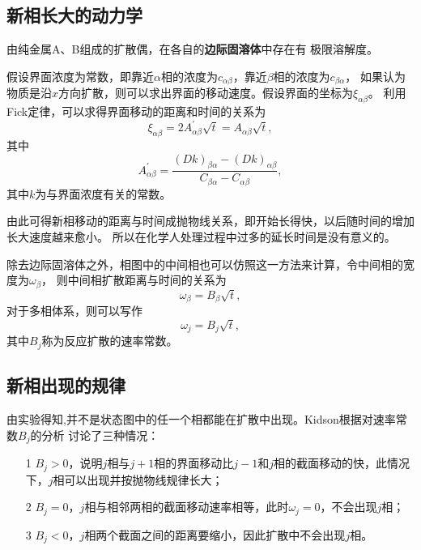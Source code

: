         \subsection{新相长大的动力学}
            由纯金属A、B组成的扩散偶，在各自的\textbf{边际固溶体}中存在有
            极限溶解度。

            假设界面浓度为常数，即靠近$\alpha$相的浓度为$c_{\alpha\beta}$，靠近$\beta$相的浓度为$c_{\beta\alpha}$，
            如果认为物质是沿$x$方向扩散，则可以求出界面的移动速度。假设界面的坐标为$\xi_{\alpha\beta}$。
            利用Fick定律，可以求得界面移动的距离和时间的关系为
            \begin{equation}
                \xi_{\alpha \beta}=2 A_{\alpha \beta}^{\prime} \sqrt{t}=A_{\alpha \beta} \sqrt{t},
            \end{equation}
            其中
            \begin{equation}
                A_{\alpha \beta}^{\prime}=\frac{(D k)_{\beta \alpha}-(D k)_{\alpha \beta}}{C_{\beta \alpha}-C_{\alpha \beta}},
            \end{equation}
            其中$k$为与界面浓度有关的常数。

            由此可得新相移动的距离与时间成抛物线关系，即开始长得快，以后随时间的增加长大速度越来愈小。
            所以在化学人处理过程中过多的延长时间是没有意义的。

            除去边际固溶体之外，相图中的中间相也可以仿照这一方法来计算，令中间相的宽度为$\omega_\beta$，
            则中间相扩散距离与时间的关系为
            \begin{equation}
                \omega_\beta=B_\beta\sqrt{t},
            \end{equation}
            对于多相体系，则可以写作
            \begin{equation}
                \omega_j=B_j\sqrt{t},
            \end{equation}
            其中$B_j$称为反应扩散的速率常数。
        \subsection{新相出现的规律}
            由实验得知,并不是状态图中的任一个相都能在扩散中出现。Kidson根据对速率常数$B_j$的分析
            讨论了三种情况：
            \begin{itemize}
                \item[1] $B_j>0$，说明$j$相与$j+1$相的界面移动比$j-1$和$j$相的截面移动的快，此情况下，$j$相可以出现并按抛物线规律长大；
                \item[2] $B_j=0$，$j$相与相邻两相的截面移动速率相等，此时$\omega_j=0$，不会出现$j$相；
                \item[3] $B_j<0$，$j$相两个截面之间的距离要缩小，因此扩散中不会出现$j$相。
            \end{itemize}
